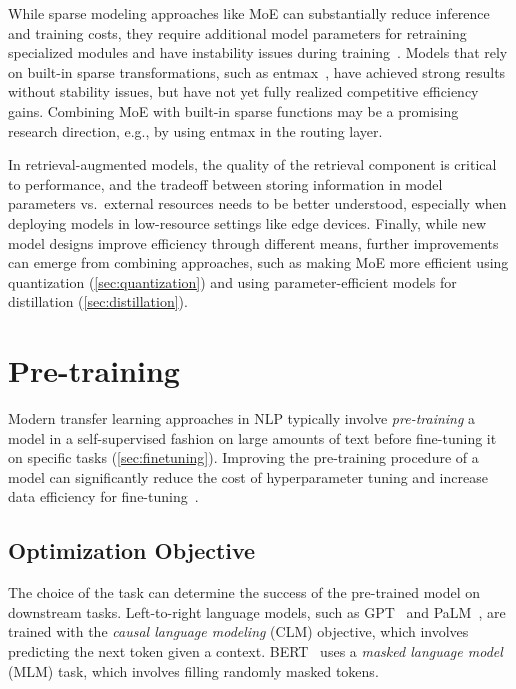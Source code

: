 While sparse modeling approaches like MoE can substantially reduce inference and training costs, they require additional model parameters for retraining specialized modules and have instability issues during training~\citep{zoph2022designing}. Models that rely on built-in sparse transformations, such as entmax~\citep{peters-etal-2019-sparse}, have achieved strong results without stability issues, but have not yet fully realized competitive efficiency gains. Combining MoE with built-in sparse functions may be a promising research direction, e.g., by using entmax in the routing layer.

In retrieval-augmented models, the quality of the retrieval component is critical to performance, and the tradeoff between storing information in model parameters vs.~external resources needs to be better understood, especially when deploying models in low-resource settings like edge devices. Finally, while new model designs improve efficiency through different means, further improvements can emerge from combining approaches, such as making MoE more efficient using quantization (\ref{sec:quantization}) and using parameter-efficient models for distillation (\ref{sec:distillation}).

\section{Pre-training}\label{sec:pretraining}

Modern transfer learning approaches in NLP typically involve \textit{pre-training} a model in a self-supervised fashion on large amounts of text before fine-tuning it on specific tasks (\ref{sec:finetuning}). 
Improving the pre-training procedure of a model can significantly reduce the cost of hyperparameter tuning and increase data efficiency for fine-tuning~\citep{Peters:2018,he2019rethinking,neyshabur2020being}. 

\subsection{Optimization Objective} The choice of the task can determine the success of the pre-trained model on downstream tasks. Left-to-right language models, such as GPT~\citep{radford2019language, brown2020language} and PaLM~\citep{palm}, are trained with the \emph{causal language modeling} (CLM) objective, which involves predicting the next token given a context. BERT~\citep{Devlin:2019} uses a \emph{masked language model} (MLM) task, which involves filling randomly masked tokens. 

